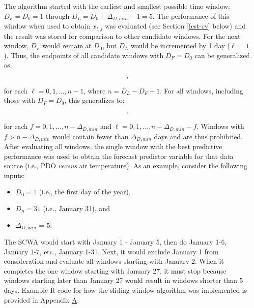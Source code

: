 \documentclass[12pt,]{book}
\providecommand{\tightlist}{%
  \setlength{\itemsep}{0pt}\setlength{\parskip}{0pt}}
\theoremstyle{definition}
\theoremstyle{definition}
\theoremstyle{definition}
\theoremstyle{remark}
\begin{document}
\noindent
The algorithm started with the earliest and smallest possible time
window: \(D_F = D_0 = 1\) through
\(D_L = D_0 + \Delta_{D,min} - 1 = 5\). The performance of this window
when used to obtain \(x_{t,j}\) was evaluated (see Section \ref{fcst-cv}
below) and the result was stored for comparison to other candidate
windows. For the next window, \(D_F\) would remain at \(D_0\), but
\(D_L\) would be incremented by 1 day (\(\ell=1\)). Thus, the endpoints
of all candidate windows with \(D_F = D_0\) can be generalized as:

\begin{equation}
  [D_0, D_0 + \Delta_{D,min} - 1 + \ell],
\label{eq:scwa-1}
\end{equation}

\noindent
for each \(\ell = 0, 1, ..., n - 1\), where \(n = D_L - D_F + 1\). For
all windows, including those with \(D_F = D_0\), this generalizes to:

\begin{equation}
  [D_0 + f, D_0 + f + \Delta_{D,min} - 1 + \ell],
\label{eq:scwa-2}
\end{equation}

\noindent
for each \(f = 0, 1, ..., n - \Delta_{D,min}\) and
\(\ell = 0, 1, ..., n - \Delta_{D,min} - f\). Windows with
\(f > n - \Delta_{D,min}\) would contain fewer than \(\Delta_{D,min}\)
days and are thus prohibited. After evaluating all windows, the single
window with the best predictive performance was used to obtain the
forecast predictor variable for that data source (i.e., PDO
\emph{versus} air temperature). As an example, consider the following
inputs:

\begin{itemize}
\tightlist
\item
  \(D_0 = 1\) (i.e., the first day of the year),
\item
  \(D_n = 31\) (i.e., January 31), and
\item
  \(\Delta_{D,min}\) = 5.
\end{itemize}

The SCWA would start with January 1 - January 5, then do January 1-6,
January 1-7, etc., January 1-31. Next, it would exclude January 1 from
consideration and evaluate all windows starting with January 2. When it
completes the one window starting with January 27, it must stop because
windows starting later than January 27 would result in windows shorter
than 5 days. Example R code for how the sliding window algorithm was
implemented is provided in Appendix \protect\hyperlink{appendix-a}{A}.
\end{document}
